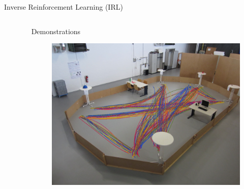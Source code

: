 \documentclass{beamer}
\begin{document}
\begin{frame}{Inverse Reinforcement Learning (IRL)}
\begin{columns}
\begin{column}{0.2\textwidth}
\begin{figure}
      \end{figure}
    \end{column}
    \begin{column}{0.8\textwidth}
      Demonstrations
      \begin{figure}
        \centering
        \includegraphics[width=\textwidth]{images/image-013.png}
      \end{figure}
    \end{column}
  \end{columns}
  \begin{spacing}{0.5}
    {\tiny\color{gray}}
  \end{spacing}
\end{frame}

\end{document}
